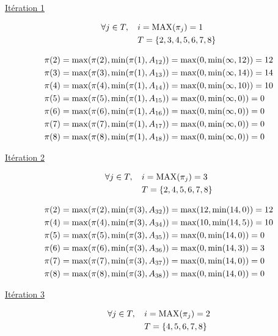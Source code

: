 \documentclass{article}
\begin{document}
\underline{Itération 1}

\begin{align*}
  \forall j \in T,\;\;\;\; &i = \operatorname{MAX}(\pi_j) = 1\\
  &T = \{2,3,4,5,6,7,8\}
\end{align*}

\begin{align*}
&\pi(2) = \operatorname{max}(\pi(2), \operatorname{min}(\pi(1), A_{12})) = \operatorname{max}(0, \operatorname{min}(\infty,12)) = 12\\
&\pi(3) = \operatorname{max}(\pi(3), \operatorname{min}(\pi(1), A_{13})) = \operatorname{max}(0, \operatorname{min}(\infty,14)) = 14\\
&\pi(4) = \operatorname{max}(\pi(4), \operatorname{min}(\pi(1), A_{14})) = \operatorname{max}(0, \operatorname{min}(\infty,10)) = 10\\
&\pi(5) = \operatorname{max}(\pi(5), \operatorname{min}(\pi(1), A_{15})) = \operatorname{max}(0, \operatorname{min}(\infty,0)) = 0\\
&\pi(6) = \operatorname{max}(\pi(6), \operatorname{min}(\pi(1), A_{16})) = \operatorname{max}(0, \operatorname{min}(\infty,0)) = 0\\
&\pi(7) = \operatorname{max}(\pi(7), \operatorname{min}(\pi(1), A_{17})) = \operatorname{max}(0, \operatorname{min}(\infty,0)) = 0\\
&\pi(8) = \operatorname{max}(\pi(8), \operatorname{min}(\pi(1), A_{18})) = \operatorname{max}(0, \operatorname{min}(\infty,0)) = 0
\end{align*}

\underline{Itération 2}

\begin{align*}
  \forall j \in T,\;\;\;\; &i = \operatorname{MAX}(\pi_j) = 3\\
  &T = \{2,4,5,6,7,8\}
\end{align*}

\begin{align*}
&\pi(2) = \operatorname{max}(\pi(2), \operatorname{min}(\pi(3), A_{32})) = \operatorname{max}(12, \operatorname{min}(14,0)) = 12\\
&\pi(4) = \operatorname{max}(\pi(4), \operatorname{min}(\pi(3), A_{34})) = \operatorname{max}(10, \operatorname{min}(14,5)) = 10\\
&\pi(5) = \operatorname{max}(\pi(5), \operatorname{min}(\pi(3), A_{35})) = \operatorname{max}(0, \operatorname{min}(14,0)) = 0\\
&\pi(6) = \operatorname{max}(\pi(6), \operatorname{min}(\pi(3), A_{36})) = \operatorname{max}(0, \operatorname{min}(14,3)) = 3\\
&\pi(7) = \operatorname{max}(\pi(7), \operatorname{min}(\pi(3), A_{37})) = \operatorname{max}(0, \operatorname{min}(14,0)) = 0\\
&\pi(8) = \operatorname{max}(\pi(8), \operatorname{min}(\pi(3), A_{38})) = \operatorname{max}(0, \operatorname{min}(14,0)) = 0
\end{align*}

\underline{Itération 3}

\begin{align*}
  \forall j \in T,\;\;\;\; &i = \operatorname{MAX}(\pi_j) = 2\\
  &T = \{4,5,6,7,8\}
\end{align*}
\end{document}
